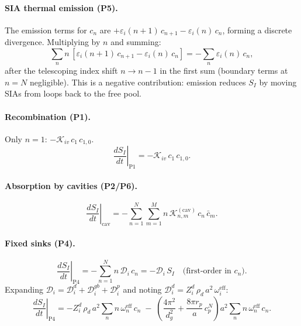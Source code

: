 \documentclass[pdflatex,sn-basic]{sn-jnl} %
\begin{document}
\paragraph{SIA thermal emission (P5).}
The emission terms for $c_n$ are $+\varepsilon_i(n{+}1)\,c_{n+1} -
\varepsilon_i(n)\,c_n$, forming a discrete divergence. Multiplying by $n$
and summing:
\begin{equation}\label{eq:P5_SI}
    \sum_n n\,[\varepsilon_i(n{+}1)\,c_{n+1} - \varepsilon_i(n)\,c_n]
    = -\sum_n \varepsilon_i(n)\,c_n,
\end{equation}
after the telescoping index shift $n \to n-1$ in the first sum (boundary
terms at $n=N$ negligible). This is a negative contribution: emission
reduces $S_I$ by moving SIAs from loops back to the free pool.

\paragraph{Recombination (P1).}
Only $n=1$: $-\mathcal{K}_{iv}\,c_1\,c_{1,0}$.
\begin{equation}\label{eq:P1_SI}
    \left.\frac{dS_I}{dt}\right|_{\mathrm{P1}} = -\mathcal{K}_{iv}\,c_1\,c_{1,0}.
\end{equation}

\paragraph{Absorption by cavities (P2/P6).}
\begin{equation}\label{eq:P2_SI}
    \left.\frac{dS_I}{dt}\right|_{\mathrm{cav}}
    = -\sum_{n=1}^{N}\sum_{m=1}^{M}
      n\,\mathcal{K}_{n,m}^{(\mathrm{cav})}\,c_n\,\bar{c}_m.
\end{equation}

\paragraph{Fixed sinks (P4).}
\begin{equation}\label{eq:P4_SI}
    \left.\frac{dS_I}{dt}\right|_{\mathrm{P4}}
    = -\sum_{n=1}^{N} n\,\mathcal{D}_i\,c_n
    = -\mathcal{D}_i\,S_I \quad \text{(first-order in }c_n\text{)}.
\end{equation}
Expanding $\mathcal{D}_i = \mathcal{D}_i^d + \mathcal{D}_i^{gb} +
\mathcal{D}_i^p$ and noting $\mathcal{D}_i^d = Z_i^d\,\rho_d\,a^2\,
\omega_i^{\mathrm{eff}}$:
\begin{equation}
    \left.\frac{dS_I}{dt}\right|_{\mathrm{P4}}
    = -Z_i^d\,\rho_d\,a^2\sum_n n\,\omega_n^{\mathrm{eff}}\,c_n
    \;-\; \left(\frac{4\pi^2}{d_g^2} + \frac{8\pi r_p}{a}\,c_p^N\right)
      a^2\sum_n n\,\omega_n^{\mathrm{eff}}\,c_n.
\end{equation}
\end{document}
